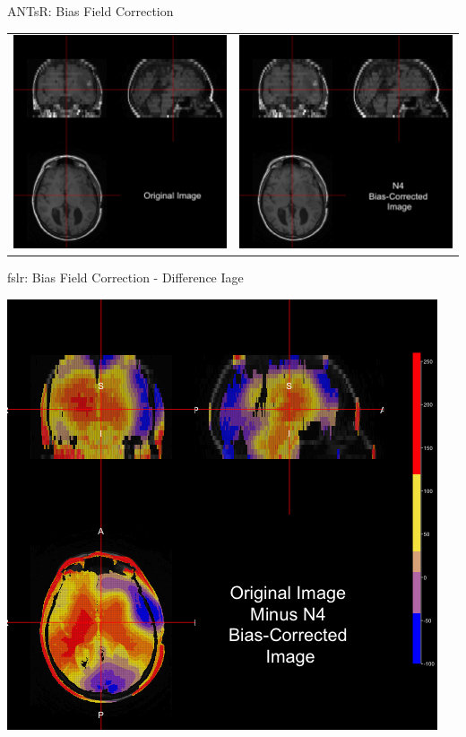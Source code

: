 \documentclass[11pt]{beamer}\usepackage[]{graphicx}\usepackage[]{color}
\begin{document}
\begin{frame}[fragile]{ANTsR: Bias Field Correction}

\begin{tabular}{cc}
\includegraphics[width=0.5\linewidth]{Orig_Image.png} & \includegraphics[width=0.5\linewidth]{N4_Image.png}
\end{tabular}

\end{frame}


\begin{frame}[fragile]{fslr: Bias Field Correction - Difference Iage}

\includegraphics[width=0.5\linewidth]{N4_Diff_Image.png}

\end{frame}
\end{document}

